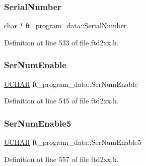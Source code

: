 \mbox{\label{structft__program__data_a81ddee025aa0fa0b48189fb0ee7c5b46}} 
\subsubsection{\texorpdfstring{Serial\+Number}{SerialNumber}}
{\footnotesize\ttfamily char $\ast$ ft\+\_\+program\+\_\+data\+::\+Serial\+Number}



Definition at line 533 of file ftd2xx.\+h.

\mbox{\label{structft__program__data_a4b2ef7f478af34cea6af64d0b0506c1e}} 
\subsubsection{\texorpdfstring{Ser\+Num\+Enable}{SerNumEnable}}
{\footnotesize\ttfamily \hyperlink{CatCaloProto40MHz_2inc_2WinTypes_8h_a4f4bb67531a9bf6f0b9c6ad76aeba587}{U\+C\+H\+AR} ft\+\_\+program\+\_\+data\+::\+Ser\+Num\+Enable}



Definition at line 545 of file ftd2xx.\+h.

\mbox{\label{structft__program__data_a45d2edb9ee08c9d92c3d5d0d0ac79fd7}} 
\subsubsection{\texorpdfstring{Ser\+Num\+Enable5}{SerNumEnable5}}
{\footnotesize\ttfamily \hyperlink{CatCaloProto40MHz_2inc_2WinTypes_8h_a4f4bb67531a9bf6f0b9c6ad76aeba587}{U\+C\+H\+AR} ft\+\_\+program\+\_\+data\+::\+Ser\+Num\+Enable5}



Definition at line 557 of file ftd2xx.\+h.

